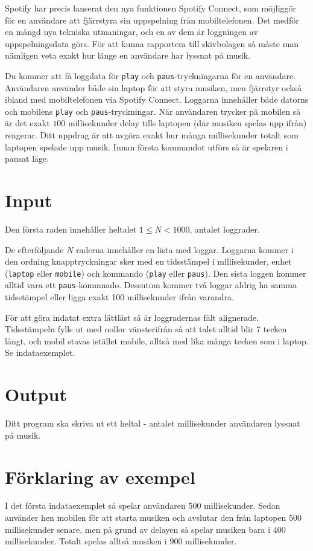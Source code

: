 
Spotify har precis lanserat den nya funktionen Spotify Connect, som möjliggör för
en användare att fjärrstyra sin uppspelning från mobiltelefonen. Det medför en
mängd nya tekniska utmaningar, och en av dem är loggningen av uppspelningsdata görs.
För att kunna rapportera till skivbolagen så måste man nämligen veta exakt hur länge
en användare har lyssnat på musik.

Du kommer att få loggdata för \texttt{play} och \texttt{paus}-tryckningarna
för en användare. Användaren använder både sin laptop för att styra musiken, men
fjärrstyr också ibland med mobiltelefonen via Spotify Connect. Loggarna innehåller både
datorns och mobilens \texttt{play} och \texttt{paus}-tryckningar. När användaren trycker
på mobilen så är det exakt $100$ millisekunder delay tills laptopen
(där musiken spelas upp ifrån) reagerar. Ditt uppdrag är att
avgöra exakt hur många millisekunder totalt som laptopen spelade upp musik.
Innan första kommandot utförs så är spelaren i pausat läge.

\section*{Input}
Den första raden innehåller heltalet $1 \le N < 1000$, antalet loggrader.

De efterföljande $N$ raderna innehåller en lista med loggar. Loggarna kommer
i den ordning knapptryckningar sker med en tidsstämpel i millisekunder, enhet
(\texttt{laptop} eller \texttt{mobile}) och kommando (\texttt{play} eller \texttt{paus}). Den
sista loggen kommer
alltid vara ett \texttt{paus}-kommnado. Dessutom kommer två loggar aldrig ha samma
tidsstämpel eller ligga exakt 100 millisekunder ifrån varandra.

För att göra indatat extra lättläst så är loggradernas fält
alignerade. Tidsstämpeln fylls ut med nollor vänsterifrån så att talet
alltid blir 7 tecken långt, och mobil stavas istället mobile, alltså med lika
många tecken som i laptop. Se indataexemplet.

\section*{Output}
Ditt program ska skriva ut ett heltal - antalet millisekunder användaren lyssnat på musik.

\section*{Förklaring av exempel}
I det första indataexemplet så spelar användaren 500 millisekunder. Sedan använder hen
mobilen för att starta musiken och avslutar den från laptopen $500$ millisekunder
senare, men på grund av delayen så spelar musiken bara i 400 millisekunder.
Totalt spelas alltså musiken i $900$ millisekunder.

